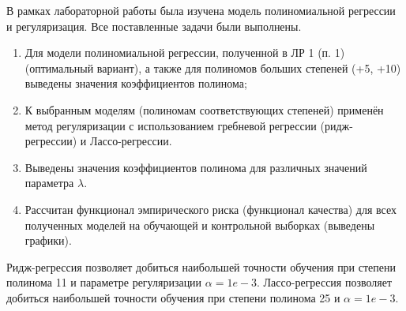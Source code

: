 
В рамках лабораторной работы была изучена модель полиномиальной регрессии и регуляризация. Все поставленные задачи были выполнены.

\begin{enumerate}[label*=\arabic*)]
	\item Для модели полиномиальной регрессии, полученной в ЛР 1 (п. 1) (оптимальный вариант), а также для полиномов больших  степеней (+5, +10) выведены значения коэффициентов полинома;
	\item К выбранным моделям (полиномам соответствующих степеней) применён метод регуляризации с использованием гребневой регрессии (ридж-регрессии) и Лассо-регрессии. 
	\item Выведены значения коэффициентов полинома для различных значений параметра $\lambda$. 
	\item Рассчитан функционал эмпирического риска (функционал качества) для всех полученных моделей на обучающей и контрольной выборках (выведены графики).
\end{enumerate}

Ридж-регрессия позволяет добиться наибольшей точности обучения при степени полинома 11 и параметре регуляризации $\alpha = 1e-3$. Лассо-регрессия позволяет добиться наибольшей точности обучения при степени полинома 25 и $\alpha = 1e-3$.
